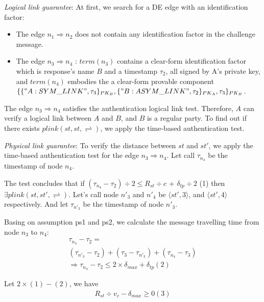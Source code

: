 \emph{Logical link guarantee}: At first, we search for a DE edge with an identification factor:
\begin{itemize}
\item The edge $n_1 \Rightarrow n_2$ does not contain any identification factor in the challenge message. 
\item The edge $n_3 \Rightarrow n_4$ : $term(n_3)$ contains a clear-form identification factor which is response's name $B$ and a timestamp $\tau_2$, all signed by A's private key, and $term(n_4)$ embodies the a clear-form provable component $\{\{ "A:SYM\_LINK", \tau_3\}_{PK_B} ,\{ "B:ASYM\_LINK",\tau_2\}_{PK_A} ,\tau_3\}_{PK_B}$.
\end{itemize}

The edge $n_3 \Rightarrow n_4$ satisfies the authentication logical link test. Therefore, $A$ can verify a logical link between $A$ and $B$, and $B$ is a regular party. To find out if there exists $plink(st,st,\rightleftharpoons)$, we apply the time-based authentication test.  

\emph{Physical link guarantee}: To verify the distance between $st$ and $st'$, we apply the time-based authentication test for the edge $n_3 \Rightarrow n_4$. Let call $\tau_{n_4}$ be the timestamp of node $n_4$. 


The test concludes that if $(\tau_{n_4} - \tau_2) \div 2 \le R_{st} \div c$ + $\delta_{tp} \div 2$ (1) then $\exists plink(st,st', \rightleftharpoons)$. Let's call node $n'_3$ and $n'_4$ be $\langle st',3\rangle$, and $\langle st',4\rangle$ respectively. And let $\tau_{n'_3}$ be the timestamp of node $n'_3$. 

Basing on assumption ps1 and ps2, we calculate the message travelling time from node $n_3$ to $n_4$:
\begin{equation*}
\label{equation1}
\begin{split}
\tau_{n_4} - \tau_2 = \\
(\tau_{n'_3} - \tau_2) + (\tau_3 - \tau_{n'_3}) + (\tau_{n_4} - \tau_3) \\
\Rightarrow \tau_{n_4} - \tau_2 \le 2 \times \delta_{max} + \delta_{tp} (2)
\end{split}
\end{equation*}

 Let $2\times(1) - (2)$, we have
\begin{equation*}
\label{equation2}
\begin{split}
	R_{st} \div v_c - \delta_{max} \ge 0 (3)
\end{split}
\end{equation*}

